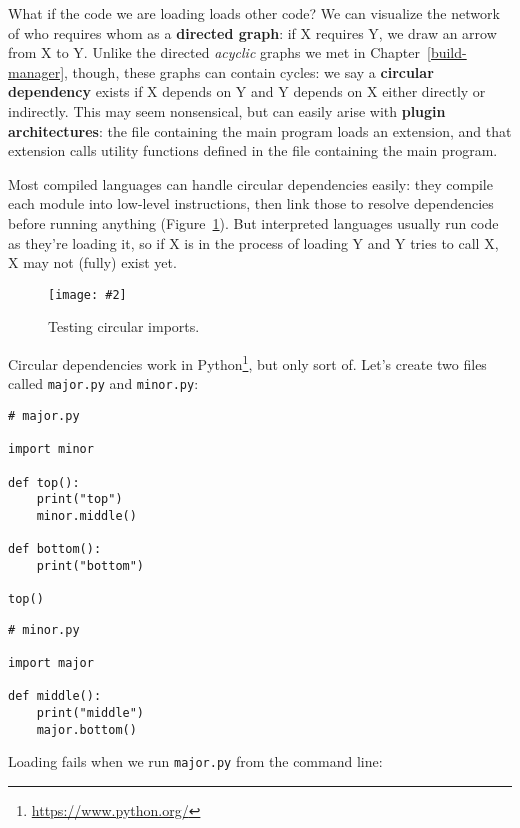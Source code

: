 \documentclass[krantzl]{krantz}
\newcommand{\figpdf}[4]{\begin{figure}%
\centering%
\texttt{[image: \#2]}%
\caption{#3}%
\label{#1}%
\end{figure}}
\newcommand{\chapref}[1]{Chapter~\ref{#1}}
\newcommand{\figref}[1]{Figure~\ref{#1}}
\newcommand{\glossref}[1]{\textbf{#1}}
\newcommand{\hreffoot}[2]{{#1}\footnote{\href{#2}{#2}}}
\begin{document}
What if the code we are loading loads other code?
We can visualize the network of who requires whom as a \glossref{directed graph}:
if X requires Y,
we draw an arrow from X to Y.
Unlike the directed \emph{acyclic} graphs we met in \chapref{build-manager},
though,
these graphs can contain cycles:
we say a \glossref{circular dependency} exists
if X depends on Y and Y depends on X
either directly or indirectly.
This may seem nonsensical,
but can easily arise with \glossref{plugin architectures}:
the file containing the main program loads an extension,
and that extension calls utility functions defined in the file containing the main program.


Most compiled languages can handle circular dependencies easily:
they compile each module into low-level instructions,
then link those to resolve dependencies before running anything
(\figref{module-loader-circularity}).
But interpreted languages usually run code as they're loading it,
so if X is in the process of loading Y and Y tries to call X,
X may not (fully) exist yet.

\figpdf{module-loader-circularity}{./module-loader/circularity.pdf}{Testing circular imports.}{0.6}


Circular dependencies work in \hreffoot{Python}{https://www.python.org/},
but only sort of.
Let's create two files called \texttt{major.py} and \texttt{minor.py}:


\begin{lstlisting}[frame=single,frameround=tttt]
# major.py

import minor

def top():
    print("top")
    minor.middle()

def bottom():
    print("bottom")

top()
\end{lstlisting}



\begin{lstlisting}[frame=single,frameround=tttt]
# minor.py

import major

def middle():
    print("middle")
    major.bottom()
\end{lstlisting}



Loading fails when we run \texttt{major.py} from the command line:
\end{document}
